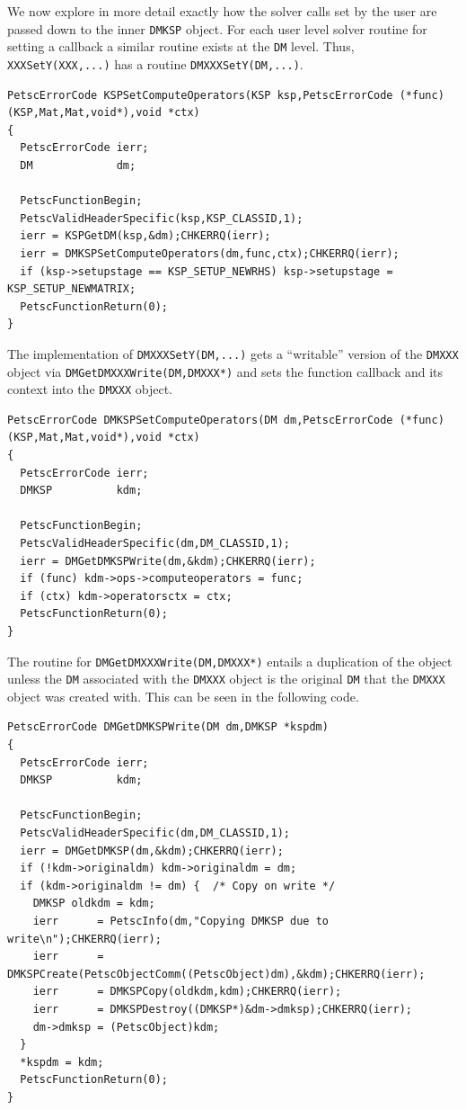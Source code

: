 We now explore in more detail exactly how the solver calls set by the user are passed down to the inner \lstinline{DMKSP} object. For each user
level solver routine for setting a callback a similar routine exists at the \lstinline{DM} level. Thus, \lstinline{XXXSetY(XXX,...)} has a routine \lstinline{DMXXXSetY(DM,...)}.
\begin{lstlisting}
PetscErrorCode KSPSetComputeOperators(KSP ksp,PetscErrorCode (*func)(KSP,Mat,Mat,void*),void *ctx)
{
  PetscErrorCode ierr;
  DM             dm;

  PetscFunctionBegin;
  PetscValidHeaderSpecific(ksp,KSP_CLASSID,1);
  ierr = KSPGetDM(ksp,&dm);CHKERRQ(ierr);
  ierr = DMKSPSetComputeOperators(dm,func,ctx);CHKERRQ(ierr);
  if (ksp->setupstage == KSP_SETUP_NEWRHS) ksp->setupstage = KSP_SETUP_NEWMATRIX;
  PetscFunctionReturn(0);
}
\end{lstlisting}
The implementation of \lstinline{DMXXXSetY(DM,...)} gets a ``writable'' version of the \lstinline{DMXXX} object via \lstinline{DMGetDMXXXWrite(DM,DMXXX*)} and sets the function callback
and its context into the \lstinline{DMXXX} object.
\begin{lstlisting}
PetscErrorCode DMKSPSetComputeOperators(DM dm,PetscErrorCode (*func)(KSP,Mat,Mat,void*),void *ctx)
{
  PetscErrorCode ierr;
  DMKSP          kdm;

  PetscFunctionBegin;
  PetscValidHeaderSpecific(dm,DM_CLASSID,1);
  ierr = DMGetDMKSPWrite(dm,&kdm);CHKERRQ(ierr);
  if (func) kdm->ops->computeoperators = func;
  if (ctx) kdm->operatorsctx = ctx;
  PetscFunctionReturn(0);
}
\end{lstlisting}
The routine for \lstinline{DMGetDMXXXWrite(DM,DMXXX*)} entails a duplication of the object unless the \lstinline{DM} associated with the \lstinline{DMXXX} object is the original \lstinline{DM} that
the \lstinline{DMXXX} object was created with. This can be seen in the following code.
\begin{lstlisting}
PetscErrorCode DMGetDMKSPWrite(DM dm,DMKSP *kspdm)
{
  PetscErrorCode ierr;
  DMKSP          kdm;

  PetscFunctionBegin;
  PetscValidHeaderSpecific(dm,DM_CLASSID,1);
  ierr = DMGetDMKSP(dm,&kdm);CHKERRQ(ierr);
  if (!kdm->originaldm) kdm->originaldm = dm;
  if (kdm->originaldm != dm) {  /* Copy on write */
    DMKSP oldkdm = kdm;
    ierr      = PetscInfo(dm,"Copying DMKSP due to write\n");CHKERRQ(ierr);
    ierr      = DMKSPCreate(PetscObjectComm((PetscObject)dm),&kdm);CHKERRQ(ierr);
    ierr      = DMKSPCopy(oldkdm,kdm);CHKERRQ(ierr);
    ierr      = DMKSPDestroy((DMKSP*)&dm->dmksp);CHKERRQ(ierr);
    dm->dmksp = (PetscObject)kdm;
  }
  *kspdm = kdm;
  PetscFunctionReturn(0);
}
\end{lstlisting}
